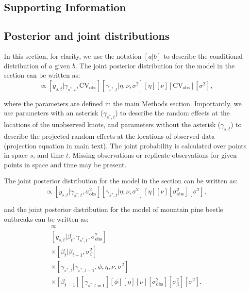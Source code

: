 \documentclass[12pt,english]{article}
\begin{document}
\begin{spacing}{1.4}

\clearpage

\section{Supporting Information}

\subsection{Posterior and joint distributions}

In this section, for clarity, we use the notation $[a|b]$ to describe the
conditional distribution of $a$ given $b$. The joint posterior distribution for
the model in the section \textit{} can be written
as:
\begin{equation}
  [
  \bm{\gamma},
  \eta,
  \nu,
  \mathrm{CV}_\mathrm{obs},
  \sigma^2
  |
  \bm{y}]
  \propto
  [y_{s,t} | \gamma_{s^*,t}, \mathrm{CV}_\mathrm{obs}]
  [\gamma_{s^*,t} | \eta, \nu, \sigma^2]
  [\eta]
  [\nu]
  [\mathrm{CV}_\mathrm{obs}]
  [\sigma^2],
\end{equation}

\noindent where the parameters are defined in the main Methods section.
Importantly, we use parameters with an asterisk ($\gamma_{s^{*},t}$) to describe
the random effects at the locations of the unobserved knots, and parameters
without the asterisk ($\gamma_{s,t}$) to describe the projected random effects
at the locations of observed data (projection equation in main text). The joint
probability is calculated over points in space $s$, and time $t$. Missing
observations or replicate observations for given points in space and time may be
present.

The joint posterior distribution for the model in the section
\textit{} can be written as:
\begin{equation}
  [
  \bm{\gamma},
  \eta,
  \nu,
  \sigma^2_{\mathrm{obs}},
  \sigma^2
  |
  \bm{y}]
  \propto
  [y_{s,t} | \gamma_{s^*,t}, \sigma^2_{\mathrm{obs}}]
  [\gamma_{s^*,t} | \eta, \nu, \sigma^2]
  [\eta]
  [\nu]
  [\sigma^2_{\mathrm{obs}}]
  [\sigma^2],
\end{equation}

\noindent
and the joint posterior distribution
for the model of mountain pine beetle outbreaks can be written as:
\begin{multline}
  [
  \bm{\beta},
  \bm{\gamma},
  \phi,
  \eta,
  \nu,
  \sigma^2_{\mathrm{obs}},
  \sigma^2_{\beta},
  \sigma^2
  |
  \bm{y}]
  \propto \\
  [y_{s,t} | \beta_{t}, \gamma_{s^*,t}, \sigma^2_{\mathrm{obs}}] \\
  \times
  [\beta_t | \beta_{t-1}, \sigma^2_{\beta}] \\
  \times
  [\gamma_{s^*,t} | \gamma_{s^*,t-1}, \phi, \eta, \nu, \sigma^2] \\
  \times
  [\beta_{t=1}]
  [\gamma_{s^*,t=1}]
  [\phi]
  [\eta]
  [\nu]
  [\sigma^2_{\mathrm{obs}}]
  [\sigma^2_{\beta}]
  [\sigma^2].
\end{multline}


\end{spacing}
\end{document}

